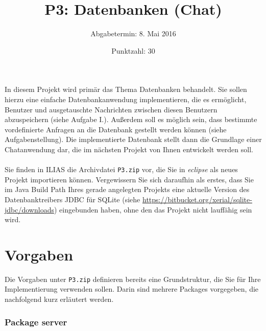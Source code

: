 \documentclass[12pt]{article}
\begin{document}


\title{\textbf{P3: Datenbanken (Chat)}}
\author{Abgabetermin: 8. Mai 2016}
\date{Punktzahl: 30}
\maketitle

\subsection*{}

In diesem Projekt wird primär das Thema Datenbanken behandelt. Sie sollen
hierzu eine einfache Datenbankanwendung implementieren, die es ermöglicht,
Benutzer und ausgetauschte Nachrichten zwischen diesen Benutzern abzuspeichern
(siehe Aufgabe I.). Außerdem soll es möglich sein, dass bestimmte
vordefinierte Anfragen an die Datenbank gestellt werden können (siehe
Aufgabenstellung). Die implementierte Datenbank stellt dann die Grundlage
einer Chatanwendung dar, die im nächsten Projekt von Ihnen entwickelt werden
soll.  
\\ \\
Sie finden in ILIAS die Archivdatei \texttt{P3.zip} vor, die Sie in \emph{eclipse} als neues Projekt importieren können. Vergewissern Sie sich daraufhin als erstes, dass Sie im Java Build Path Ihres gerade angelegten Projekts eine aktuelle Version des Datenbanktreibers JDBC für SQLite (siehe \url{https://bitbucket.org/xerial/sqlite-jdbc/downloads}) eingebunden haben, ohne den das Projekt nicht lauffähig sein wird.


\section*{Vorgaben}
Die Vorgaben unter \texttt{P3.zip} definieren bereits eine Grundstruktur, die
Sie für Ihre Implementierung verwenden sollen. Darin sind mehrere Packages
vorgegeben, die nachfolgend kurz erläutert werden. 

\subsubsection*{Package server}

\end{document}
